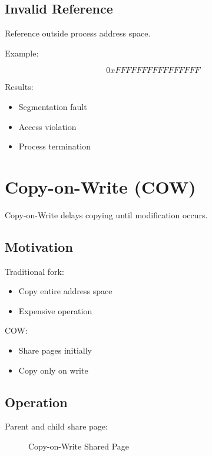 \subsection{Invalid Reference}

Reference outside process address space.

Example:

\[
0xFFFFFFFFFFFFFFFF
\]

Results:

\begin{itemize}
\item Segmentation fault
\item Access violation
\item Process termination
\end{itemize}

\section{Copy-on-Write (COW)}

Copy-on-Write delays copying until modification occurs.

\subsection{Motivation}

Traditional fork:

\begin{itemize}
\item Copy entire address space
\item Expensive operation
\end{itemize}

COW:

\begin{itemize}
\item Share pages initially
\item Copy only on write
\end{itemize}

\subsection{Operation}

Parent and child share page:

\begin{figure}[H]
\centering
{}
\caption{Copy-on-Write Shared Page}
\end{figure}

